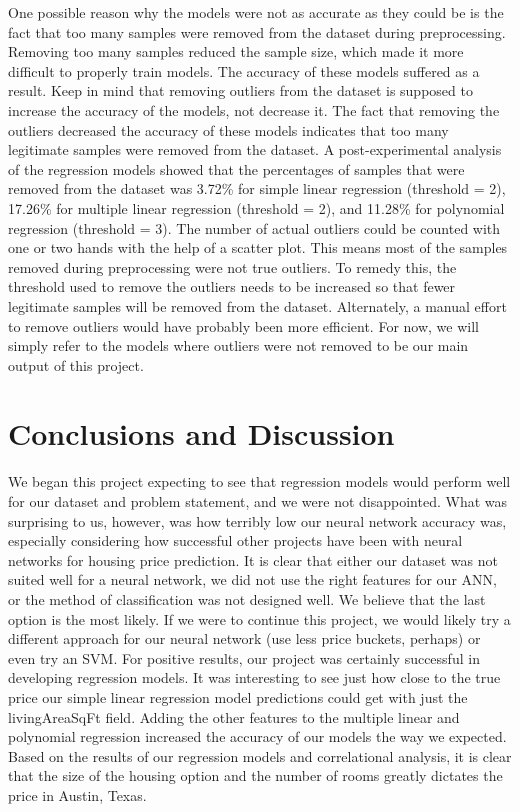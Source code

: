 \documentclass[12pt]{article}
\begin{document}
	One possible reason why the models were not as accurate as they could be is the fact that too many samples were removed from the dataset during preprocessing. Removing too many samples reduced the sample size, which made it more difficult to properly train models. The accuracy of these models suffered as a result. Keep in mind that removing outliers from the dataset is supposed to increase the accuracy of the models, not decrease it. The fact that removing the outliers decreased the accuracy of these models indicates that too many legitimate samples were removed from the dataset. A post-experimental analysis of the regression models showed that the percentages of samples that were removed from the dataset was 3.72\% for simple linear regression (threshold = 2), 17.26\% for multiple linear regression (threshold = 2), and 11.28\% for polynomial regression (threshold = 3). The number of actual outliers could be counted with one or two hands with the help of a scatter plot. This means most of the samples removed during preprocessing were not true outliers. To remedy this, the threshold used to remove the outliers needs to be increased so that fewer legitimate samples will be removed from the dataset. Alternately, a manual effort to remove outliers would have probably been more efficient. For now, we will simply refer to the models where outliers were not removed to be our main output of this project. 
	
	\section{Conclusions and Discussion}
	
	We began this project expecting to see that regression models would perform well for our dataset and problem statement, and we were not disappointed. What was surprising to us, however, was how terribly low our neural network accuracy was, especially considering how successful other projects have been with neural networks for housing price prediction. It is clear that either our dataset was not suited well for a neural network, we did not use the right features for our ANN, or the method of classification was not designed well. We believe that the last option is the most likely. If we were to continue this project, we would likely try a different approach for our neural network (use less price buckets, perhaps) or even try an SVM. For positive results, our project was certainly successful in developing regression models. It was interesting to see just how close to the true price our simple linear regression model predictions could get with just the livingAreaSqFt field. Adding the other features to the multiple linear and polynomial regression increased the accuracy of our models the way we expected. Based on the results of our regression models and correlational analysis, it is clear that the size of the housing option and the number of rooms greatly dictates the price in Austin, Texas.
	
\end{document}
